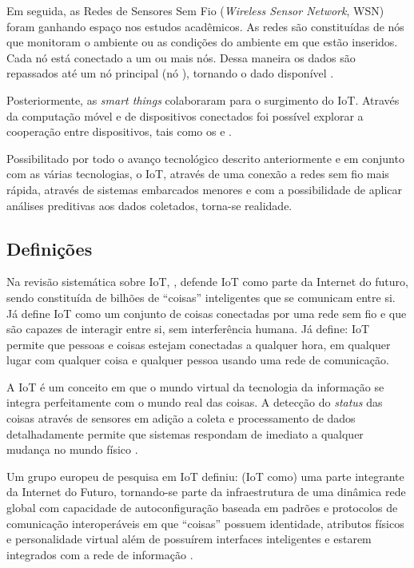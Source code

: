Em seguida, as Redes de Sensores Sem Fio (\textit{Wireless Sensor Network}, WSN)
foram ganhando espaço nos estudos acadêmicos. As redes são constituídas de nós
que monitoram o ambiente ou as condições do ambiente em que estão inseridos.
Cada nó está conectado a um ou mais nós. Dessa maneira os dados são repassados
até um nó principal (nó \gateway), tornando o dado disponível
\cite{lewis2004wireless}.

Posteriormente, as \textit{smart things} colaboraram para o surgimento do IoT.
Através da computação móvel e de dispositivos conectados foi possível explorar
a cooperação entre dispositivos, tais como os \smartphones[] e \smartwatches.

Possibilitado por todo o avanço tecnológico descrito anteriormente e em
conjunto com as várias tecnologias, o IoT, através de uma conexão a redes sem
fio mais rápida, através de sistemas embarcados menores e com a possibilidade
de aplicar análises preditivas aos dados coletados, torna-se realidade.

\subsection{Definições} \label{subsec:iot-definicoes}

Na revisão sistemática sobre IoT, , defende IoT como
parte da Internet do futuro, sendo constituída de bilhões de ``coisas''
inteligentes que se comunicam entre si. Já  define
IoT como um conjunto de coisas conectadas por uma rede sem fio e que são
capazes de interagir entre si, sem interferência humana. Já
 define: IoT permite que pessoas e coisas
estejam conectadas a qualquer hora, em qualquer lugar com qualquer coisa e
qualquer pessoa usando uma rede de comunicação.

A IoT é um conceito em que o mundo virtual da tecnologia da informação se 
integra perfeitamente com o mundo real das coisas. A detecção do \textit{status}
das coisas através de sensores em adição a coleta e processamento de dados
detalhadamente permite que sistemas respondam de imediato a qualquer mudança
no mundo físico \cite{uckelmann2011architectural}.

Um grupo europeu de pesquisa em IoT definiu: (IoT como) uma parte integrante da
Internet do Futuro, tornando-se parte da infraestrutura de uma dinâmica rede
global com capacidade de autoconfiguração baseada em padrões e protocolos
de comunicação interoperáveis em que ``coisas'' possuem identidade, atributos
físicos e personalidade virtual além de possuírem interfaces inteligentes e
estarem integrados com a rede de informação \cite{cerpiot2009}.

